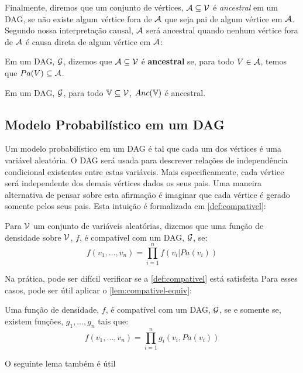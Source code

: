 Finalmente, diremos que um conjunto de vértices,
${\mathcal A} \subseteq {\mathcal V}$ é \textit{ancestral} em um DAG,
se não existe algum vértice fora de ${\mathcal A}$ que
seja pai de algum vértice em ${\mathcal A}$.
Segundo nossa interpretação causal,
${\mathcal A}$ será ancestral quando 
nenhum vértice fora de ${\mathcal A}$ 
é causa direta de 
algum vértice em ${\mathcal A}$:

\begin{definition}
 \label{def:ancestral}
 Em um DAG, ${\mathcal G}$,
 dizemos que ${\mathcal A} \subseteq {\mathcal V}$ é \textbf{ancestral} se,
 para todo $V \in {\mathcal A}$, temos que
 $Pa(V) \subseteq {\mathcal A}$.
\end{definition}

\begin{lemma}
 \label{lem:anc}
 Em um DAG, ${\mathcal G}$,
 para todo ${\mathbb V} \subseteq {\mathcal V}$, 
 $Anc({\mathbb V})$ é ancestral.
\end{lemma}

\subsection{Modelo Probabilístico em um DAG}

Um modelo probabilístico em um DAG é
tal que cada um dos vértices é uma variável aleatória.
O DAG será usada para descrever 
relações de independência condicional existentes entre
estas variáveis.
Mais especificamente, cada vértice será
independente dos demais vértices dados os seus pais.
Uma maneira alternativa de pensar sobre esta afirmação é
imaginar que cada vértice é gerado somente pelos seus pais.
Esta intuição é formalizada em \cref{def:compativel}:

\begin{definition}
 \label{def:compativel}
 Para ${\mathcal V}$ um conjunto de variáveis aleatórias,
 dizemos que uma função de densidade sobre ${\mathcal V}$, 
 $f$, é compatível com um DAG, ${\mathcal G}$, se:
 $$f(v_1,\ldots,v_n) = \prod_{i=1}^n f(v_i|Pa(v_i))$$
\end{definition}

Na prática, pode ser difícil verificar 
se a \cref{def:compativel} está satisfeita 
Para esses casos,
pode ser útil aplicar o 
\cref{lem:compativel-equiv}:

\begin{lemma}
 \label{lem:compativel-equiv}
 Uma função de densidade, $f$, é
 compatível com um DAG, ${\mathcal G}$,
 se e somente se, existem funções,
 $g_1,\ldots,g_n$ tais que:
 $$f(v_1,\ldots,v_n) = \prod_{i=1}^n g_i(v_i, Pa(v_i))$$
\end{lemma}

O seguinte lema também é útil

